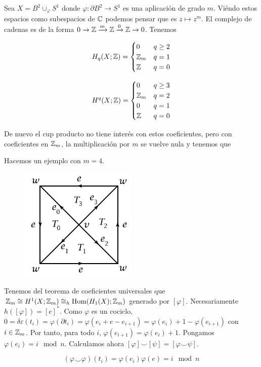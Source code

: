 \documentclass[TA.tex]{subfiles}
\begin{document}
\begin{ej}
Sea $X=B^2\cup_\varphi S^1$ donde $\varphi:\partial B^2\to S^1$ es una aplicación de grado $m$. Viéndo estos espacios como subespacios de $\mathbb{C}$ podemos pensar que es $z\mapsto z^m$. El complejo de cadenas es de la forma $0\to\mathbb{Z}\xrightarrow{m}\mathbb{Z}\xrightarrow{0}\mathbb{Z}\to 0$. Tenemos 

\[
H_q(X;\mathbb{Z})=\begin{cases}
0 & q\geq 2\\
\mathbb{Z}_m & q=1\\
\mathbb{Z} & q=0
\end{cases}
\]

\[
H^q(X;\mathbb{Z})=\begin{cases}
0 & q\geq 3\\
\mathbb{Z}_m & q=2\\
0 & q=1\\
\mathbb{Z} & q=0
\end{cases}
\]

De nuevo el cup producto no tiene interés con estos coeficientes, pero con coeficientes en $\mathbb{Z}_m$, la multiplicación por $m$ se vuelve nula y tenemos que 

Hacemos un ejemplo con $m=4$.

\begin{figure}[h!]
\includegraphics[scale=0.7]{3-9}
\end{figure}

Tenemos del teorema de coeficientes universales que $\mathbb{Z}_m\cong H^1(X;\mathbb{Z}_m)\cong_h\operatorname{Hom}(H_1(X);\mathbb{Z}_m)$ generado por $[\varphi]$. Necesariamente $h([\varphi])=[e]^*$. Como $\varphi$ es un cociclo, $0=\delta\varepsilon(t_i)=\varphi(\partial t_i)=\varphi(e_i+e-e_{i+1})=\varphi(e_i)+1-\varphi(e_{i+1})$ con $i\in\mathbb{Z}_m$. Por tanto, para todo $i$, $\varphi(e_{i+1})=\varphi(e_i)+1$. Pongamos $\varphi(e_i)=i\mod n$. Calculamos ahora $[\varphi]\smile[\psi]=[\varphi\smile\psi]$. 

$$
(\varphi\smile\varphi)(t_i)=\varphi(e_i)\varphi(e)=i\mod n
$$


\end{ej}
\end{document}
